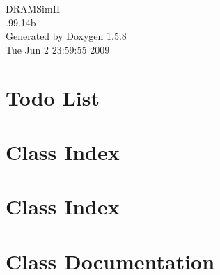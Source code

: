 \documentclass[a4paper]{book}
\begin{document}
\begin{titlepage}
\vspace*{7cm}
\begin{center}
{\Large DRAMSimII \\[1ex]\large .99.14b }\\
\vspace*{1cm}
{\large Generated by Doxygen 1.5.8}\\
\vspace*{0.5cm}
{\small Tue Jun 2 23:59:55 2009}\\
\end{center}
\end{titlepage}
\clearemptydoublepage
{}
\tableofcontents
\clearemptydoublepage
{}
\chapter{Todo List}
\label{todo}

\chapter{Class Index}

\chapter{Class Index}

\chapter{Class Documentation}






















\printindex
\end{document}

